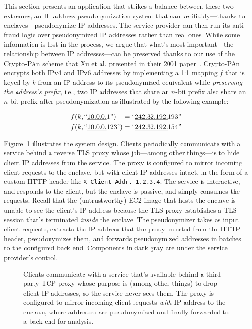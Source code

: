 This section presents an application that strikes a balance between these two
extremes; an IP address pseudonymization system that can verifiably---thanks to
enclaves---pseudonymize IP addresses.  The service provider can then run its
anti-fraud logic over pseudonymized IP addresses rather than real ones.  While
some information is lost in the process, we argue that what's most
important---the relationship between IP addresses---can be preserved thanks to
our use of the Crypto-PAn scheme that Xu et al. presented in their 2001
paper~\cite{Xu01a}.  Crypto-PAn encrypts both IPv4 and IPv6 addresses by
implementing a 1:1 mapping $f$ that is keyed by $k$ from an IP address to its
pseudonymized equivalent while \emph{preserving the address's prefix}, i.e., two
IP addresses that share an $n$-bit prefix also share an $n$-bit prefix after
pseudonymization as illustrated by the following example:

\begin{align}
f(k, \textrm{``\underline{10.0.0.}1''})\phantom{23} = \textrm{``\underline{242.32.192.}193''} \\
f(k, \textrm{``\underline{10.0.0.}123''}) = \textrm{``\underline{242.32.192.}154''}
\end{align}

Figure~\ref{fig:address-anonymizer} illustrates the system design.  Clients
periodically communicate with a service behind a reverse TLS proxy whose
job---among other things---is to hide client IP addresses from the service.  The
proxy is configured to mirror incoming client requests to the enclave, but with
client IP addresses intact, in the form of a custom HTTP header like
\texttt{X-Client-Addr: 1.2.3.4}.  The service is interactive, and responds to
the client, but the enclave is passive, and simply consumes the requests.
Recall that the (untrustworthy) EC2 image that hosts the enclave is unable to
see the client's IP address because the TLS proxy establishes a TLS session
that's terminated \emph{inside} the enclave.  The pseudonymizer takes as input
client requests, extracts the IP address that the proxy inserted from the HTTP
header, pseudonymizes them, and forwards pseudonymized addresses in batches to
the configured back end.  Components in dark gray are under the service
provider's control.

\begin{figure}[t]
\centering

\caption{Clients communicate with a service that's available behind a
  third-party TCP proxy whose purpose is (among other things) to drop client IP
  addresses, so the service never sees them.  The proxy is configured to mirror
  incoming client requests \emph{with} IP address to the enclave, where
  addresses are pseudonymized and finally forwarded to a back end for analysis.}
\label{fig:address-anonymizer}
\end{figure}

